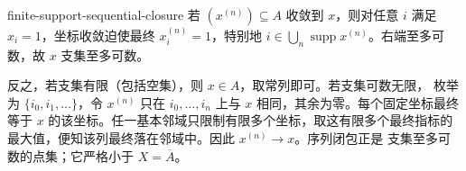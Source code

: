 \begin{solution}{finite-support-sequential-closure}
若 \((x^{(n)})\subseteq A\) 收敛到 \(x\)，则对任意 \(i\) 满足 \(x_i=1\)，坐标收敛迫使最终 \(x_i^{(n)}=1\)，特别地 \(i\in\bigcup_n\operatorname{supp}x^{(n)}\)。右端至多可数，故 \(x\) 支集至多可数。

反之，若支集有限（包括空集），则 \(x\in A\)，取常列即可。若支集可数无限，
枚举为 \(\{i_0,i_1,\ldots\}\)，令 \(x^{(n)}\) 只在
\(i_0,\ldots,i_n\) 上与 \(x\) 相同，其余为零。每个固定坐标最终等于
\(x\) 的该坐标。任一基本邻域只限制有限多个坐标，取这有限多个最终指标的
最大值，便知该列最终落在邻域中。因此 \(x^{(n)}\to x\)。序列闭包正是
支集至多可数的点集；它严格小于 \(X=\overline A\)。
\end{solution}
